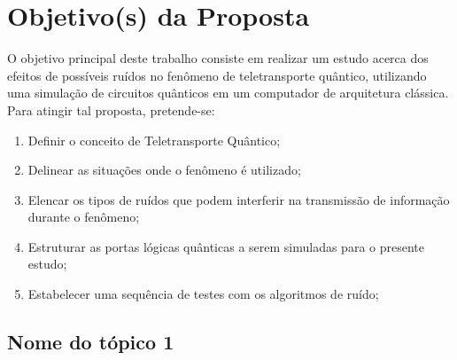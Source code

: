 \documentclass[12pt,oneside,brazil,hidelinks,article,sumario=tradicional,a4paper]{abntex2}
\begin{document}

\section{Objetivo(s) da Proposta}\label{sec:objs}

O objetivo principal deste trabalho consiste em realizar um estudo acerca dos efeitos de possíveis ruídos no fenômeno de teletransporte quântico, utilizando uma simulação de circuitos quânticos em um computador de arquitetura clássica. Para atingir tal proposta, pretende-se:
\begin{enumerate}
\item Definir o conceito de Teletransporte Quântico;
\item Delinear as situações onde o fenômeno é utilizado;
\item Elencar os tipos de ruídos que podem interferir na transmissão de informação durante o fenômeno;
\item Estruturar as portas lógicas quânticas a serem simuladas para o presente estudo;
\item Estabelecer uma sequência de testes com os algoritmos de ruído;
\end{enumerate} 

\subsection{Nome do tópico 1}\label{obj1}
\end{document}

